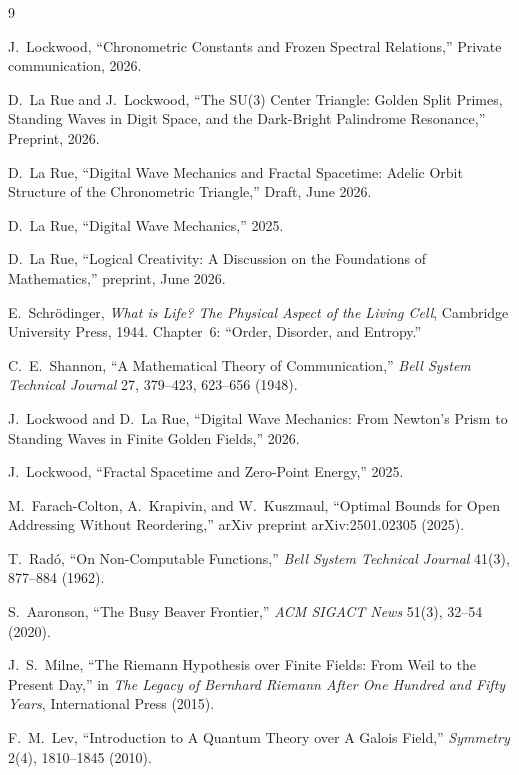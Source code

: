 \begin{thebibliography}{9}

J.~Lockwood,
``Chronometric Constants and Frozen Spectral Relations,''
Private communication, 2026.

D.~La Rue and J.~Lockwood,
``The SU(3) Center Triangle: Golden Split Primes, Standing Waves in Digit Space, and the Dark-Bright Palindrome Resonance,''
Preprint, 2026.

D.~La Rue,
``Digital Wave Mechanics and Fractal Spacetime:
Adelic Orbit Structure of the Chronometric Triangle,''
Draft, June 2026.

D.~La Rue,
``Digital Wave Mechanics,'' 2025.

D.~La Rue,
``Logical Creativity: A Discussion on the Foundations of Mathematics,''
preprint, June 2026.

E.~Schr\"odinger,
\emph{What is Life? The Physical Aspect of the Living Cell},
Cambridge University Press, 1944.
Chapter~6: ``Order, Disorder, and Entropy.''

C.~E.~Shannon,
``A Mathematical Theory of Communication,''
\emph{Bell System Technical Journal} 27, 379--423, 623--656 (1948).

J.~Lockwood and D.~La Rue,
``Digital Wave Mechanics: From Newton's Prism to Standing Waves
in Finite Golden Fields,'' 2026.

J.~Lockwood,
``Fractal Spacetime and Zero-Point Energy,'' 2025.

M.~Farach-Colton, A.~Krapivin, and W.~Kuszmaul,
``Optimal Bounds for Open Addressing Without Reordering,''
arXiv preprint arXiv:2501.02305 (2025).

T.~Rad\'o,
``On Non-Computable Functions,''
\emph{Bell System Technical Journal} 41(3), 877--884 (1962).

S.~Aaronson,
``The Busy Beaver Frontier,''
\emph{ACM SIGACT News} 51(3), 32--54 (2020).

J.~S.~Milne,
``The Riemann Hypothesis over Finite Fields: From Weil to the Present Day,''
in \emph{The Legacy of Bernhard Riemann After One Hundred and Fifty Years},
International Press (2015).

F.~M.~Lev,
``Introduction to A Quantum Theory over A Galois Field,''
\emph{Symmetry} 2(4), 1810--1845 (2010).


\end{thebibliography}
